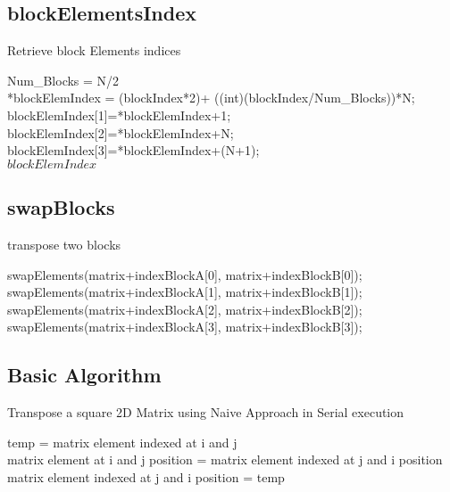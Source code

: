 \documentclass[10pt,onecolumn]{article}
\begin{document}
\subsection{blockElementsIndex}
    \begin{algorithm}[H]
        \caption{Retrieve block Elements indices}
        Num\_Blocks = N/2\\
        *blockElemIndex =  (blockIndex*2)+ ((int)(blockIndex/Num\_Blocks))*N;\\
	    blockElemIndex[1]=*blockElemIndex+1; \\
	    blockElemIndex[2]=*blockElemIndex+N;\\
	    blockElemIndex[3]=*blockElemIndex+(N+1);\\
        \Return $blockElemIndex$
    \end{algorithm}
%
\subsection{swapBlocks}
    \begin{algorithm}[H]
        \caption{transpose two blocks}
        swapElements(matrix+indexBlockA[0], matrix+indexBlockB[0]);\\
	swapElements(matrix+indexBlockA[1], matrix+indexBlockB[1]);\\
	swapElements(matrix+indexBlockA[2], matrix+indexBlockB[2]);\\
	swapElements(matrix+indexBlockA[3], matrix+indexBlockB[3]);\\
    \end{algorithm}
%
\subsection{Basic Algorithm}
%
\begin{algorithm}[H]
    \caption{Transpose a square 2D Matrix using Naive Approach in Serial execution}
    {
        {
            temp = matrix element indexed at i and j \\
            matrix element at i and j position = matrix element indexed at j and i position\\
            matrix element indexed at j and i position = temp
        }
    }
\end{algorithm}
%
\end{document}
